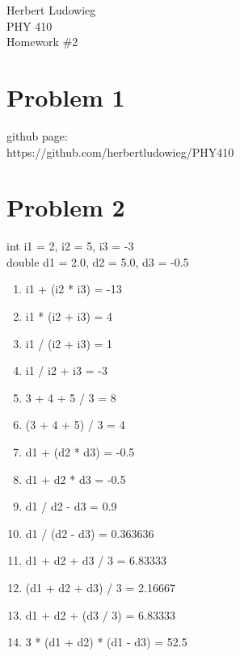 \documentclass{article}
\begin{document}
Herbert Ludowieg \\
PHY 410 \\
Homework \#2 \\
\section{Problem 1}
github page: \\
https://github.com/herbertludowieg/PHY410
\section{Problem 2}
int i1 = 2, i2 = 5, i3 = -3 \\
double d1 = 2.0, d2 = 5.0, d3 = -0.5
\begin{enumerate}[label=(\alph*)]
\item 
i1 + (i2 * i3) = -13
\item
i1 * (i2 + i3) = 4
\item
i1 / (i2 + i3) = 1
\item
i1 / i2 + i3 = -3
\item
3 + 4 + 5 / 3 = 8
\item 
(3 + 4 + 5) / 3 = 4
\item 
d1 + (d2 * d3) = -0.5
\item
d1 + d2 * d3 = -0.5
\item
d1 / d2 - d3 = 0.9
\item
d1 / (d2 - d3) = 0.363636
\item
d1 + d2 + d3 / 3 = 6.83333
\item
(d1 + d2 + d3) / 3 = 2.16667
\item
d1 + d2 + (d3 / 3) = 6.83333
\item
3 * (d1 + d2) * (d1 - d3) = 52.5
\end{enumerate}
\end{document}
